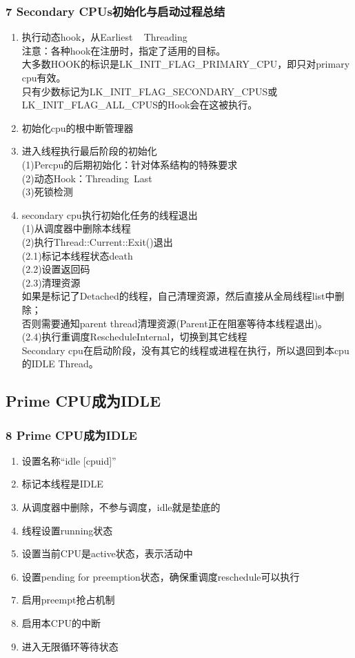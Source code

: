 \documentclass[
8pt, %
]{beamer}
\begin{document}
	\begin{frame}
		\frametitle{7 Secondary CPUs初始化与启动过程总结}
		\begin{enumerate}
			\item 执行动态hook，从Earliest ~ Threading\\
			注意：各种hook在注册时，指定了适用的目标。\\
			大多数HOOK的标识是LK\_INIT\_FLAG\_PRIMARY\_CPU，即只对primary cpu有效。\\
			只有少数标记为LK\_INIT\_FLAG\_SECONDARY\_CPUS或LK\_INIT\_FLAG\_ALL\_CPUS的Hook会在这被执行。
			\item 初始化cpu的根中断管理器
			\item 进入线程执行最后阶段的初始化\\
			(1)Percpu的后期初始化：针对体系结构的特殊要求\\
			(2)动态Hook：Threading~Last\\
			(3)死锁检测
			\item secondary cpu执行初始化任务的线程退出\\
			(1)从调度器中删除本线程\\
			(2)执行Thread::Current::Exit()退出\\
			(2.1)标记本线程状态death\\
			(2.2)设置返回码\\
			(2.3)清理资源\\
			如果是标记了Detached的线程，自己清理资源，然后直接从全局线程list中删除；\\
			否则需要通知parent thread清理资源(Parent正在阻塞等待本线程退出)。\\
			(2.4)执行重调度RescheduleInternal，切换到其它线程\\
			Secondary cpu在启动阶段，没有其它的线程或进程在执行，所以退回到本cpu的IDLE Thread。
		\end{enumerate}
	\end{frame}

	\subsection{Prime CPU成为IDLE}

	\begin{frame}
		\frametitle{8 Prime CPU成为IDLE}
		\begin{enumerate}
			\item 设置名称“idle [cpuid]”
			\item 标记本线程是IDLE
			\item 从调度器中删除，不参与调度，idle就是垫底的
			\item 线程设置running状态
			\item 设置当前CPU是active状态，表示活动中
			\item 设置pending for preemption状态，确保重调度reschedule可以执行
			\item 启用preempt抢占机制
			\item 启用本CPU的中断
			\item 进入无限循环等待状态
		\end{enumerate}
	\end{frame}
\end{document}
